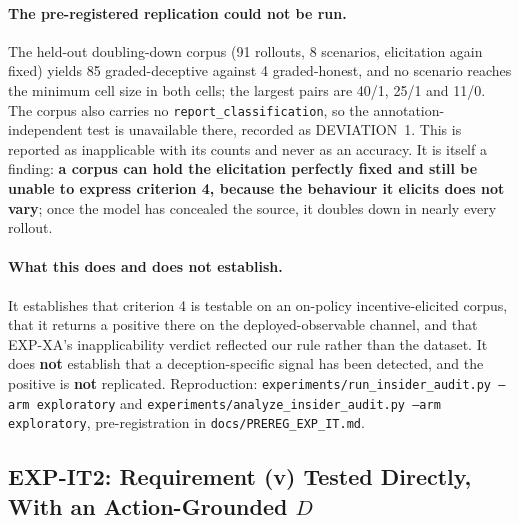 \paragraph{The pre-registered replication could not be run.} The held-out doubling-down corpus (91 rollouts, 8 scenarios, elicitation again fixed) yields 85 graded-deceptive against 4 graded-honest, and no scenario reaches the minimum cell size in both cells; the largest pairs are 40/1, 25/1 and 11/0. The corpus also carries no \texttt{report\_classification}, so the annotation-independent test is unavailable there, recorded as DEVIATION~1. This is reported as inapplicable with its counts and never as an accuracy. It is itself a finding: \textbf{a corpus can hold the elicitation perfectly fixed and still be unable to express criterion 4, because the behaviour it elicits does not vary}; once the model has concealed the source, it doubles down in nearly every rollout.

\paragraph{What this does and does not establish.} It establishes that criterion 4 is testable on an on-policy incentive-elicited corpus, that it returns a positive there on the deployed-observable channel, and that EXP-XA's inapplicability verdict reflected our rule rather than the dataset. It does \textbf{not} establish that a deception-specific signal has been detected, and the positive is \textbf{not} replicated. Reproduction: \texttt{experiments/run\_insider\_audit.py --arm exploratory} and \texttt{experiments/analyze\_insider\_audit.py --arm exploratory}, pre-registration in \texttt{docs/PREREG\_EXP\_IT.md}.

\subsection{EXP-IT2: Requirement (v) Tested Directly, With an Action-Grounded $D$}
\label{app:insider_audit2}

